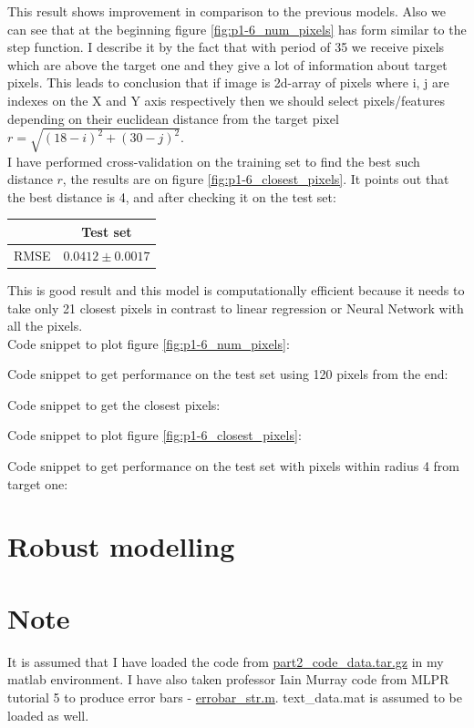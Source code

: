 \documentclass{article}
\begin{document}
			This result shows improvement in comparison to the previous models. Also we can see that at the beginning figure \ref{fig:p1-6_num_pixels} has form similar to the step function. I describe it by the fact that with period of 35 we receive pixels which are above the target one and they give a lot of information about target pixels. This leads to conclusion that if image is 2d-array of pixels where i, j are indexes on the X and Y axis respectively then we should select pixels/features depending on their euclidean distance from the target pixel $r = \sqrt{(18 - i)^2 + (30 - j)^2}$. \\
			 I have performed cross-validation on the training set to find the best such distance $r$, the results are on figure \ref{fig:p1-6_closest_pixels}. It points out that the best distance is 4, and after checking it on the test set:
			\begin{center}
				\begin{tabular}{| c | c |}
					\hline
					\, &  Test set \\ \hline
					RMSE & $0.0412 \pm 0.0017$ \\ 
					\hline
				\end{tabular}
			\end{center}
			This is good result and this model is computationally efficient because it needs to take only 21 closest pixels in contrast to linear regression or Neural Network with all the pixels. \\ 
			Code snippet to plot figure \ref{fig:p1-6_num_pixels}:
			
			Code snippet to get performance on the test set using 120 pixels from the end:
			
			Code snippet to get the closest pixels:
			
			Code snippet to plot figure \ref{fig:p1-6_closest_pixels}:
			
			Code snippet to get performance on the test set with pixels within radius 4 from target one:
			
			\newpage
			
		\section{Robust modelling}
			\section*{Note}
				It is assumed that I have loaded the code from \href{http://www.inf.ed.ac.uk/teaching/courses/mlpr/2015/assignment/part2_code_data.tar.gz}{part2\_code\_data.tar.gz} in my matlab environment. I have also taken professor Iain Murray code from MLPR tutorial 5 to produce error bars - \href{http://homepages.inf.ed.ac.uk/imurray2/code/imurray-matlab/errorbar_str.m}{errobar\_str.m}. text\_data.mat is assumed to be loaded as well.
\end{document}
